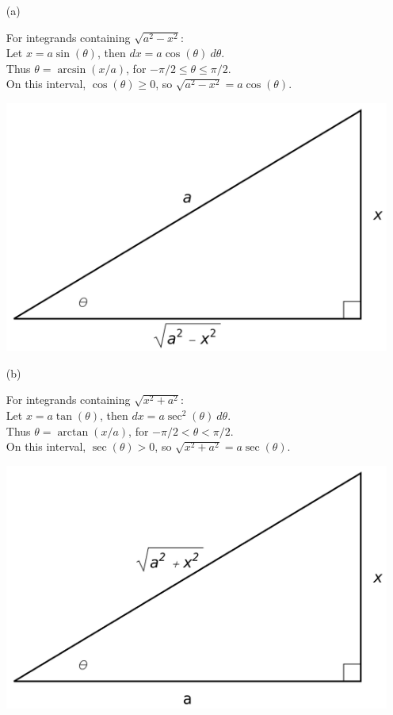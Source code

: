 \begin{enumerate}
	\item[(a)] \noindent%
		\begin{minipage}[t]{.6\linewidth}%
		For integrands containing $\sqrt{a^2-x^2}$:\\[5pt]
		Let $x=a\sin(\theta)$, then $dx = a\cos(\theta)\ d\theta$.\\[5pt]	
	Thus $\theta = \arcsin(x/a)$, for $-\pi/2\leq \theta\leq \pi/2$. \\[5pt]
	On this interval, $\cos(\theta)\geq 0$, so 	$\sqrt{a^2-x^2} = a\cos(\theta).$
		\end{minipage}\qquad
	\begin{minipage}[t]{.4\linewidth}\vskip 0pt
		\includegraphics[width=.95\linewidth]{fig_int_13a}
		\end{minipage}
		
	\item[(b)] \noindent
	\begin{minipage}[t]{.6\linewidth}
		For integrands containing $\sqrt{x^2+a^2}$:\\[5pt]
		Let $x=a\tan(\theta)$, then $dx = a\sec^2(\theta)\ d\theta$.\\[5pt]	
	Thus $\theta = \arctan(x/a)$, for $-\pi/2 < \theta < \pi/2$. \\[5pt]	
	On this interval, $\sec(\theta)> 0$, so $\sqrt{x^2+a^2} = a\sec(\theta).$
		\end{minipage}\qquad
	\begin{minipage}[t]{.4\linewidth}\vskip 0pt
		\includegraphics[width=.95\linewidth]{fig_int_13b}
		\end{minipage}
		

\end{enumerate}
